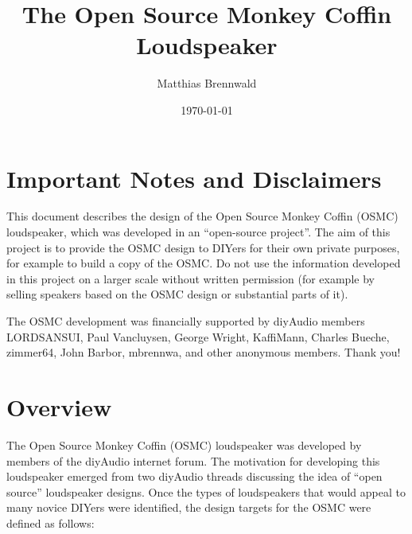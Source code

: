 \documentclass[12pt,a4paper]{article}
\title{The Open Source Monkey Coffin Loudspeaker} \author{Matthias Brennwald} \date{\today}
\begin{document}
\maketitle
\vfill


\begin{center}
\end{center}

\thispagestyle{empty}

\clearpage

\vspace{0.2\textheight}

\section*{Important Notes and Disclaimers}
This document describes the design of the Open Source Monkey Coffin (OSMC) loudspeaker, which was developed in an ``open-source project''\cite{osmc_p1}. The aim of this project is to provide the OSMC design to DIYers for their own private purposes, for example to build a copy of the OSMC. Do not use the information developed in this project on a larger scale without written permission (for example by selling speakers based on the OSMC design or substantial parts of it).\par

The OSMC development was financially supported by diyAudio members LORDSANSUI, Paul Vancluysen, George Wright, KaffiMann, Charles Bueche, zimmer64, John Barbor, mbrennwa, and other anonymous members. Thank you!

\clearpage

\section{Overview}
The Open Source Monkey Coffin (OSMC) loudspeaker was developed by members of the diyAudio internet forum\cite{osmc_p1}. The motivation for developing this loudspeaker emerged from two diyAudio threads discussing the idea of ``open source'' loudspeaker designs\cite{osproj1_p1,osproj2_p1}. Once the types of loudspeakers that would appeal to many novice DIYers were identified, the design targets for the OSMC were defined as follows:
\end{document}
